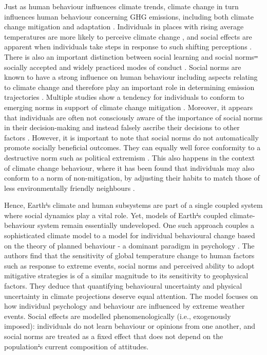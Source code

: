 \documentclass[10pt,letterpaper]{article}
\providecommand{\DIFaddtex}[1]{{\protect\color{blue}\uwave{#1}}} %
\providecommand{\DIFdeltex}[1]{{\protect\color{red}\sout{#1}}}                      %
\providecommand{\DIFaddbegin}{} %
\providecommand{\DIFaddend}{} %
\providecommand{\DIFdelbegin}{} %
\providecommand{\DIFdelend}{} %
\providecommand{\DIFadd}[1]{\texorpdfstring{\DIFaddtex{#1}}{#1}} %
\providecommand{\DIFdel}[1]{\texorpdfstring{\DIFdeltex{#1}}{}} %
\begin{document}
Just as human behaviour influences climate trends, climate change in turn influences human behaviour concerning GHG emissions, including both climate change mitigation and adaptation \cite{castree14,clayton15,baird14,weber10,howe13}. Individuals in places with rising average temperatures are more likely to perceive climate change \cite{howe13}, and social effects are apparent when individuals take steps in response to such shifting perceptions \cite{clayton15,baird14}. There is also an important distinction between social learning and social norms\DIFdelbegin \DIFdel{–}\DIFdelend \DIFaddbegin \DIFadd{?}\DIFaddend socially accepted and widely practiced modes of conduct \cite{allcott11}. Social norms are known to have a strong influence on human behaviour \cite{cialdini91} including aspects relating to climate change \cite{bollinger12,allcott11,nolan08} and therefore play an important role in determining emission trajectories \cite{clayton15}. Multiple studies show a tendency for individuals to conform to emerging norms in support of climate change mitigation \cite{bollinger12,allcott11}. Moreover, it appears that individuals are often not consciously aware of the importance of social norms in their decision-making and instead falsely ascribe their decisions to other factors \cite{nolan08}. However, it is important to note that social norms do not automatically promote socially beneficial outcomes. They can equally well force conformity to a destructive norm such as political extremism \cite{smith14}. This also happens in the context of climate change behaviour, where it has been found that individuals may also conform to a norm of non-mitigation, by adjusting their habits to match those of less environmentally friendly neighbours \cite{nolan08,stoll01}.

Hence, Earth\DIFdelbegin \DIFdel{’}\DIFdelend \DIFaddbegin \DIFadd{?}\DIFaddend s climate and human subsystems are part of a single coupled system where social dynamics play a vital role. Yet, models of Earth\DIFdelbegin \DIFdel{’}\DIFdelend \DIFaddbegin \DIFadd{?}\DIFaddend s coupled climate-behaviour system remain essentially undeveloped. One such approach \cite{beckage18} couples a sophisticated climate model \cite{sterman12} to a model for individual behavioural change based on the theory of planned behaviour - a dominant paradigm in psychology \cite{ajzen91}. The authors find that the sensitivity of global temperature change to human factors such as response to extreme events, social norms and perceived ability to adopt mitigative strategies is of a similar magnitude to its sensitivity to geophysical factors. They deduce that quantifying behavioural uncertainty and physical uncertainty in climate projections deserve equal attention. The model focuses on how individual psychology and behaviour are influenced by extreme weather events. Social effects are modelled phenomenologically (i.e., exogenously imposed): individuals do not learn behaviour or opinions from one another, and social norms are treated as a fixed effect that does not depend on the population\DIFdelbegin \DIFdel{’}\DIFdelend \DIFaddbegin \DIFadd{?}\DIFaddend s current composition of attitudes.
\end{document}
